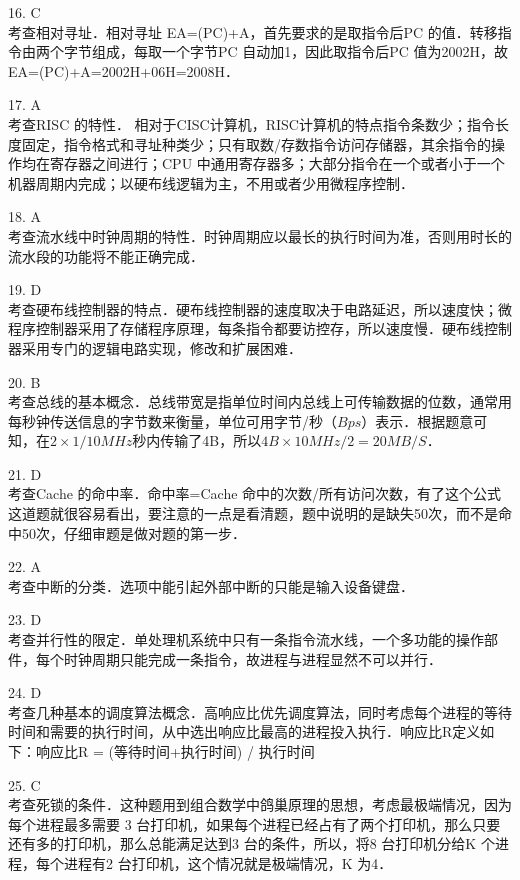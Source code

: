 16. C \\
考查相对寻址．相对寻址 EA=(PC)+A，首先要求的是取指令后PC 的值．转移指令由两个字节组成，每取一个字节PC 自动加1，因此取指令后PC 值为2002H，故EA=(PC)+A=2002H+06H=2008H．

17. A \\
考查RISC 的特性．
相对于CISC计算机，RISC计算机的特点指令条数少；指令长度固定，指令格式和寻址种类少；只有取数/存数指令访问存储器，其余指令的操作均在寄存器之间进行；CPU 中通用寄存器多；大部分指令在一个或者小于一个机器周期内完成；以硬布线逻辑为主，不用或者少用微程序控制．

18. A \\
考查流水线中时钟周期的特性．时钟周期应以最长的执行时间为准，否则用时长的流水段的功能将不能正确完成．

19. D \\
考查硬布线控制器的特点．硬布线控制器的速度取决于电路延迟，所以速度快；微程序控制器采用了存储程序原理，每条指令都要访控存，所以速度慢．硬布线控制器采用专门的逻辑电路实现，修改和扩展困难．

20. B \\
考查总线的基本概念．总线带宽是指单位时间内总线上可传输数据的位数，通常用每秒钟传送信息的字节数来衡量，单位可用字节/秒（$Bps$）表示．根据题意可知，在$2\times1/10MHz$秒内传输了4B，所以$4B\times10MHz/2=20MB/S$．

21. D \\
考查Cache 的命中率．命中率=Cache 命中的次数/所有访问次数，有了这个公式这道题就很容易看出，要注意的一点是看清题，题中说明的是缺失50次，而不是命中50次，仔细审题是做对题的第一步．

22. A \\
考查中断的分类．选项中能引起外部中断的只能是输入设备键盘．

23. D \\
考查并行性的限定．单处理机系统中只有一条指令流水线，一个多功能的操作部件，每个时钟周期只能完成一条指令，故进程与进程显然不可以并行．

24. D \\
考查几种基本的调度算法概念．高响应比优先调度算法，同时考虑每个进程的等待时间和需要的执行时间，从中选出响应比最高的进程投入执行．响应比R定义如下：响应比R = (等待时间+执行时间) / 执行时间

25. C \\
考查死锁的条件．这种题用到组合数学中鸽巢原理的思想，考虑最极端情况，因为每个进程最多需要 3 台打印机，如果每个进程已经占有了两个打印机，那么只要还有多的打印机，那么总能满足达到3 台的条件，所以，将8 台打印机分给K 个进程，每个进程有2 台打印机，这个情况就是极端情况，K 为4．


